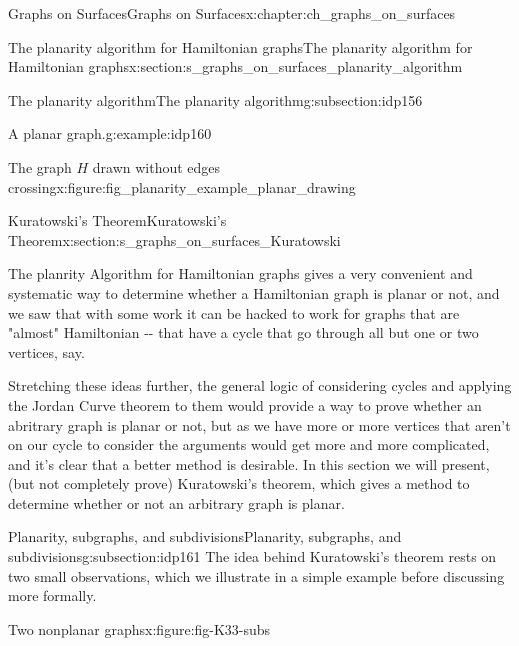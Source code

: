 \documentclass[oneside,10pt,]{book}
\numberwithin{equation}{section}
\begin{document}
\begin{chapterptx}{Graphs on Surfaces}{}{Graphs on Surfaces}{}{}{x:chapter:ch_graphs_on_surfaces}
\begin{sectionptx}{The planarity algorithm for Hamiltonian graphs}{}{The planarity algorithm for Hamiltonian graphs}{}{}{x:section:s_graphs_on_surfaces_planarity_algorithm}
\begin{subsectionptx}{The planarity algorithm}{}{The planarity algorithm}{}{}{g:subsection:idp156}
\begin{example}{A planar graph.}{g:example:idp160}
\begin{figureptx}{The graph \(H\) drawn without edges crossing}{x:figure:fig_planarity_example_planar_drawing}{}
\begin{image}{0.15}{0.7}{0.15}
{\begin{tikzpicture}[scale=.7]
\end{tikzpicture}
}%
\end{image}%
\tcblower
\end{figureptx}%
\end{example}
\end{subsectionptx}
\end{sectionptx}
%
%
\typeout{************************************************}
\typeout{************************************************}
%
\begin{sectionptx}{Kuratowski's Theorem}{}{Kuratowski's Theorem}{}{}{x:section:s_graphs_on_surfaces_Kuratowski}
\begin{introduction}{}%
The planrity Algorithm for Hamiltonian graphs gives a very convenient and systematic way to determine whether a Hamiltonian graph is planar or not, and we saw that with some work it can be hacked to work for graphs that are "almost" Hamiltonian -{}-{} that have a cycle that go through all but one or two vertices, say.%
\par
Stretching these ideas further, the general logic of considering cycles and applying the Jordan Curve theorem to them would provide a way to prove whether an abritrary graph is planar or not, but as we have more or more vertices that aren't on our cycle to consider the arguments would get more and more complicated, and it's clear that a better method is desirable.  In this section we will present, (but not completely prove) Kuratowski's theorem, which gives a method to determine whether or not an arbitrary graph is planar.%
\end{introduction}%
%
%
\typeout{************************************************}
\typeout{************************************************}
%
\begin{subsectionptx}{Planarity, subgraphs, and subdivisions}{}{Planarity, subgraphs, and subdivisions}{}{}{g:subsection:idp161}
The idea behind Kuratowski's theorem rests on two small observations, which we illustrate in a simple example before discussing more formally.%
\begin{figureptx}{Two nonplanar graphs}{x:figure:fig-K33-subs}{}%
\begin{image}{0.05}{0.9}{0.05}%
\end{image}
\end{figureptx}
\end{subsectionptx}
\end{sectionptx}
\end{chapterptx}
\end{document}
